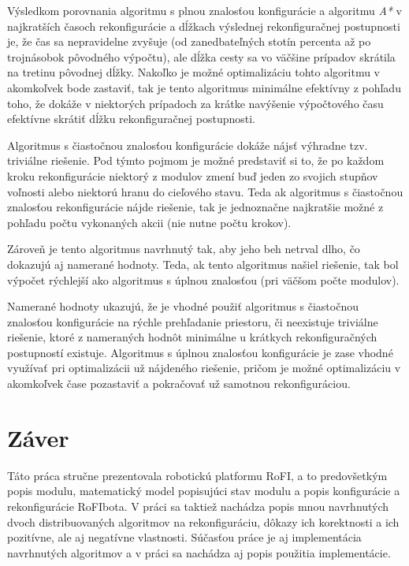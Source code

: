 \documentclass[
  printed, %
  oneside, %
  notable,   %
  nolof,     %
  nolot,     %
]{fithesis3}
\begin{document}
Výsledkom porovnania algoritmu s plnou znalosťou konfigurácie a algoritmu \textit{A*} v najkratších časoch rekonfigurácie a dĺžkach výslednej rekonfiguračnej postupnosti je, že čas sa nepravidelne zvyšuje (od zanedbateľných stotín percenta až po trojnásobok pôvodného výpočtu), ale dĺžka cesty sa vo väčšine prípadov skrátila na tretinu pôvodnej dĺžky. Nakoľko je možné optimalizáciu tohto algoritmu v akomkoľvek bode zastaviť, tak je tento algoritmus minimálne efektívny z pohľadu toho, že dokáže v niektorých prípadoch za krátke navýšenie výpočtového času efektívne skrátiť dĺžku rekonfiguračnej postupnosti. 

Algoritmus s čiastočnou znalosťou konfigurácie dokáže nájsť výhradne tzv. triviálne riešenie. Pod týmto pojmom je možné predstaviť si to, že po každom kroku rekonfigurácie niektorý z modulov zmení buď jeden zo svojich stupňov voľnosti alebo niektorú hranu do cieľového stavu. Teda ak algoritmus s čiastočnou znalosťou rekonfigurácie nájde riešenie, tak je jednoznačne najkratšie možné z pohľadu počtu vykonaných akcii (nie nutne počtu krokov). 

Zároveň je tento algoritmus navrhnutý tak, aby jeho beh netrval dlho, čo dokazujú aj namerané hodnoty. Teda, ak tento algoritmus našiel riešenie, tak bol výpočet rýchlejší ako algoritmus s úplnou znalosťou (pri väčšom počte modulov). 

Namerané hodnoty ukazujú, že je vhodné použiť algoritmus s čiastočnou znalosťou konfigurácie na rýchle prehľadanie priestoru, či neexistuje triviálne riešenie, ktoré z nameraných hodnôt minimálne u krátkych rekonfiguračných postupností existuje. Algoritmus s úplnou znalosťou konfigurácie je zase vhodné využívať pri optimalizácii už nájdeného riešenie, pričom je možné optimalizáciu v akomkoľvek čase pozastaviť a pokračovať už samotnou rekonfiguráciou. 







\chapter{Záver}
Táto práca stručne prezentovala robotickú platformu RoFI, a to predovšetkým popis modulu, matematický model popisujúci stav modulu a popis konfigurácie a rekonfigurácie RoFIbota. V práci sa taktiež nachádza popis mnou navrhnutých dvoch distribuovaných algoritmov na rekonfiguráciu, dôkazy ich korektnosti a ich pozitívne, ale aj negatívne vlastnosti. Súčasťou práce je aj implementácia navrhnutých algoritmov a v práci sa nachádza aj popis použitia implementácie. 
\end{document}
